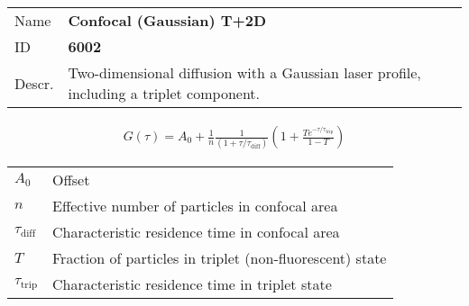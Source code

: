 \noindent \begin{tabular}{lp{}}
Name & \textbf{Confocal (Gaussian) T+2D} \\ 
ID & \textbf{6002} \\ 
Descr. &  Two-dimensional diffusion with a Gaussian laser profile, including a triplet component\cite{Aragon1976, Qian1991, Rigler1993,Widengren1994, Widengren1995, Haupts1998}. \\ 
\end{tabular}
\begin{align}
G(\tau) = A_0 + \frac{1}{n} \frac{1}{(1+\tau/\tau_\mathrm{diff})}  \left(1 + \frac{T e^{-\tau/\tau_\mathrm{trip}}}{1-T}  \right)
\end{align} 
\begin{center}
\begin{tabular}{ll}
$A_0$ & Offset \\ 
$n$ & Effective number of particles in confocal area \\ 
$\tau_\mathrm{diff}$ &  Characteristic residence time in confocal area \\ 
$T$ &  Fraction of particles in triplet (non-fluorescent) state\\ 
$\tau_\mathrm{trip}$ &  Characteristic residence time in triplet state \\ 
\end{tabular}
\end{center}
\vspace{2em}



